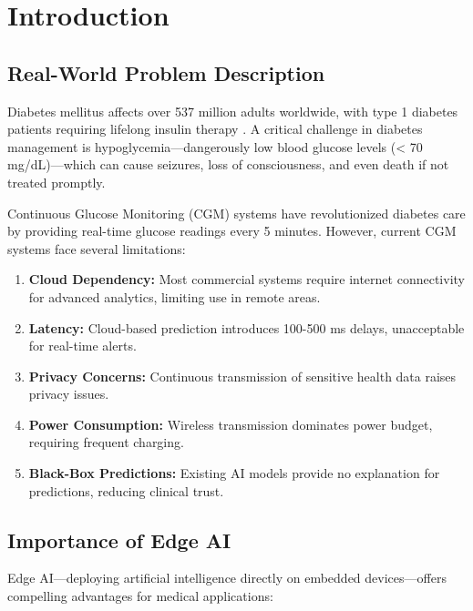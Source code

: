 \documentclass[11pt, a4paper]{article}
\begin{document}
\section{Introduction}

\subsection{Real-World Problem Description}

Diabetes mellitus affects over 537 million adults worldwide, with type 1 diabetes patients requiring lifelong insulin therapy \cite{IDF2021}. A critical challenge in diabetes management is hypoglycemia---dangerously low blood glucose levels (< 70 mg/dL)---which can cause seizures, loss of consciousness, and even death if not treated promptly.

Continuous Glucose Monitoring (CGM) systems have revolutionized diabetes care by providing real-time glucose readings every 5 minutes. However, current CGM systems face several limitations:

\begin{enumerate}
    \item \textbf{Cloud Dependency:} Most commercial systems require internet connectivity for advanced analytics, limiting use in remote areas.
    \item \textbf{Latency:} Cloud-based prediction introduces 100-500 ms delays, unacceptable for real-time alerts.
    \item \textbf{Privacy Concerns:} Continuous transmission of sensitive health data raises privacy issues.
    \item \textbf{Power Consumption:} Wireless transmission dominates power budget, requiring frequent charging.
    \item \textbf{Black-Box Predictions:} Existing AI models provide no explanation for predictions, reducing clinical trust.
\end{enumerate}

\subsection{Importance of Edge AI}

Edge AI---deploying artificial intelligence directly on embedded devices---offers compelling advantages for medical applications:
\end{document}
